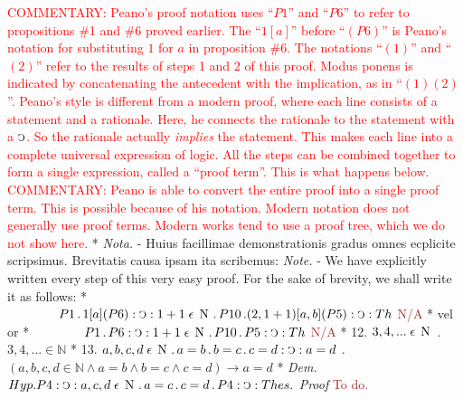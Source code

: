 \documentclass{book}
\newcommand{\C}{\mathop{\sbox0{$\displaystyle$$\reflectbox{C}$} %
\raisebox{-\height+\ht0-0.05cm}[\ht0][\dp0]{\scalebox{0.8}[0.8]{\copy0}}}\displaylimits} %
\newcommand{\p}{\mathop{\sbox0{$\displaystyle$$.$}
\raisebox{-\height+\ht0}[\ht0][\dp0]{\scalebox{1}[1]{\copy0}}}\displaylimits} %
\newcommand{\smallIn}{\ensuremath{\mathrel{\epsilon}}}
\newcommand{\N}{\mathop{\thinspace \text{N} \thinspace}}
\newcommand\commentary[1]{\textcolor{red}{COMMENTARY: #1}}
\newcommand\todo{\textcolor{brown}{To do.}}
\newcommand\notPossible{\textcolor{brown}{N/A}}
\newenvironment{translateTwoCol}
               { %
                 \columnratio{0.5, 0.5} \begin{paracol}{2}
                 \newcommand{\LAT}{\switchcolumn[0]*}
                 \newcommand{\ENG}{\switchcolumn[1]}
               }
               { %
                 \let\ENG\undefined
                 \let\LAT\undefined
                 \end{paracol}
               }
\begin{document}
\begin{translateTwoCol}
\vspace{1em}
\commentary{Peano's proof notation uses ``$P1$'' and ``$P6$'' to refer to propositions \#1 and \#6 proved earlier.  The ``$1[a]$'' before ``$(P6)$'' is Peano's notation for substituting $1$ for $a$ in proposition \#6.   The notations ``$(1)$'' and ``$(2)$'' refer to the results of steps 1 and 2 of this proof.  Modus ponens is indicated by concatenating the antecedent with the implication, as in ``$(1)(2)$''.  Peano's style is different from a modern proof, where each line consists of a statement and a rationale.  Here, he connects the rationale to the statement with a $\C$.  So the rationale actually \emph{implies} the statement.  This makes each line into a complete universal expression of logic.  All the steps can be combined together to form a single expression, called a ``proof term''.  This is what happens below.}
\ENG
\commentary{Peano is able to convert the entire proof into a single proof term.  This is possible because of his notation.  Modern notation does not generally use proof terms.  Modern works tend to use a proof tree, which we do not show here.}
\LAT
\emph{Nota.} - Huius facillimae demonstrationis gradus omnes ecplicite scripsimus. Brevitatis causa ipsam ita scribemus:
\vspace{1em}
\ENG
\vspace{1em}
\emph{Note.} - We have explicitly written every step of this very easy proof. For the sake of brevity, we shall write it as follows:
\vspace{1em}
\LAT
$\hspace{1.4cm} P 1 \p 1 [a] (P 6) : \C : 1 +1 \smallIn \N \p P 10 \p (2, 1+1) [a, b] (P 5) : \C : Th$
\ENG
\notPossible
\LAT
vel
\ENG
or
\LAT
$\hspace{1.4cm} P 1 \p P 6 : \C : 1 + 1 \smallIn \N \p P 10 \p P 5 : \C : Th$
\ENG
\notPossible
\LAT
12. \hspace{0.67cm} $3, 4,... \smallIn \N$
\ENG
12. \hspace{0.67cm} $3, 4, ... \in \mathbb{N}$
\LAT
13. \hspace{0.67cm} $a,b,c,d \smallIn \N \p a = b \p b = c \p c = d : \C : a = d$
\ENG
13. \hspace{0.67cm} $(a,b,c,d \in \mathbb{N} \wedge a = b \wedge b = c \wedge c = d ) \rightarrow a = d$
\LAT
\emph{Dem.} \hspace{0.27cm} $Hyp. P 4 : \C : a,c,d \smallIn \N \p a = c \p c = d \p P4 : \C : Thes.$
\ENG
\emph{Proof} \hspace{0.27cm} \todo

\end{translateTwoCol}
\end{document}
